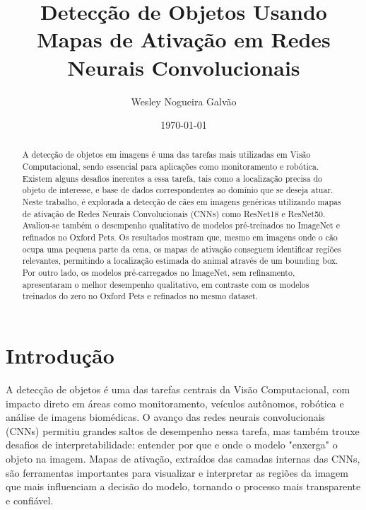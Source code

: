 \documentclass[%
 reprint,
 amsmath,amssymb,
 aps,
]{revtex4-2}
\begin{document}
\title{Detecção de Objetos Usando Mapas de Ativação em Redes Neurais Convolucionais}

\author{Wesley Nogueira Galvão}

\date{\today}

\begin{abstract}
    A detecção de objetos em imagens é uma das tarefas mais utilizadas em Visão Computacional, sendo essencial para aplicações como monitoramento e robótica. Existem alguns desafios inerentes a essa tarefa, tais como a localização precisa do objeto de interesse, e base de dados correspondentes ao domínio que se deseja atuar. Neste trabalho, é explorada a detecção de cães em imagens genéricas utilizando mapas de ativação de Redes Neurais Convolucionais (CNNs) como ResNet18 e ResNet50. Avaliou-se também o desempenho qualitativo de modelos pré-treinados no ImageNet e refinados no Oxford Pets. Os resultados mostram que, mesmo em imagens onde o cão ocupa uma pequena parte da cena, os mapas de ativação conseguem identificar regiões relevantes, permitindo a localização estimada do animal através de um bounding box. Por outro lado, os modelos pré-carregados no ImageNet, sem refinamento, apresentaram o melhor desempenho qualitativo, em contraste com os modelos treinados do zero no Oxford Pets e refinados no mesmo dataset.

\end{abstract}

\maketitle

\section{Introdução}

A detecção de objetos é uma das tarefas centrais da Visão Computacional, com impacto direto em áreas como monitoramento, veículos autônomos, robótica e análise de imagens biomédicas. O avanço das redes neurais convolucionais (CNNs) permitiu grandes saltos de desempenho nessa tarefa, mas também trouxe desafios de interpretabilidade: entender por que e onde o modelo "enxerga" o objeto na imagem. Mapas de ativação, extraídos das camadas internas das CNNs, são ferramentas importantes para visualizar e interpretar as regiões da imagem que mais influenciam a decisão do modelo, tornando o processo mais transparente e confiável.
\end{document}
